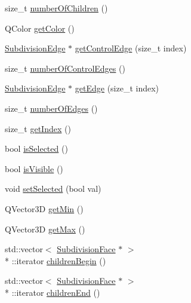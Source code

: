 \begin{DoxyCompactItemize}
\item 
size\-\_\-t \hyperlink{classShipCAD_1_1SubdivisionControlFace_aa4a26c00b8b77c0a9d78640fe465eeb1}{number\-Of\-Children} ()
\item 
Q\-Color \hyperlink{classShipCAD_1_1SubdivisionControlFace_a8a350fe4fec2ee93228ed9400a6f145c}{get\-Color} ()
\item 
\hyperlink{classShipCAD_1_1SubdivisionEdge}{Subdivision\-Edge} $\ast$ \hyperlink{classShipCAD_1_1SubdivisionControlFace_accfc3e8e3d79a2303126e44e6fdb1728}{get\-Control\-Edge} (size\-\_\-t index)
\item 
size\-\_\-t \hyperlink{classShipCAD_1_1SubdivisionControlFace_a11fd0577b7d09f1724be612af0c903a8}{number\-Of\-Control\-Edges} ()
\item 
\hyperlink{classShipCAD_1_1SubdivisionEdge}{Subdivision\-Edge} $\ast$ \hyperlink{classShipCAD_1_1SubdivisionControlFace_a37af31abc48d84d607c15158ad7c6a2a}{get\-Edge} (size\-\_\-t index)
\item 
size\-\_\-t \hyperlink{classShipCAD_1_1SubdivisionControlFace_a03ddd0f14ecc3631d1a7a2653ab0df7f}{number\-Of\-Edges} ()
\item 
size\-\_\-t \hyperlink{classShipCAD_1_1SubdivisionControlFace_a72f906db976c6530f0f2d4c03701ad15}{get\-Index} ()
\item 
bool \hyperlink{classShipCAD_1_1SubdivisionControlFace_ab56a2d4c3fccb7a578def71d286ee03c}{is\-Selected} ()
\item 
bool \hyperlink{classShipCAD_1_1SubdivisionControlFace_a2a722717e127bac12e3b81f4664fc568}{is\-Visible} ()
\item 
void \hyperlink{classShipCAD_1_1SubdivisionControlFace_a2ce580378cd200faec6a24d9d794c68e}{set\-Selected} (bool val)
\item 
Q\-Vector3\-D \hyperlink{classShipCAD_1_1SubdivisionControlFace_af78d2fd0849815610be193c99f04f5d7}{get\-Min} ()
\item 
Q\-Vector3\-D \hyperlink{classShipCAD_1_1SubdivisionControlFace_a4855077b5641cc8e644250d30cdd2629}{get\-Max} ()
\item 
std\-::vector$<$ \hyperlink{classShipCAD_1_1SubdivisionFace}{Subdivision\-Face} $\ast$ $>$\\*
\-::iterator \hyperlink{classShipCAD_1_1SubdivisionControlFace_ad20ed50df8ddd91c4aa04eb482ab0fa0}{children\-Begin} ()
\item 
std\-::vector$<$ \hyperlink{classShipCAD_1_1SubdivisionFace}{Subdivision\-Face} $\ast$ $>$\\*
\-::iterator \hyperlink{classShipCAD_1_1SubdivisionControlFace_acff2f413eceb70e345640c4519fb50bb}{children\-End} ()

\end{DoxyCompactItemize}
